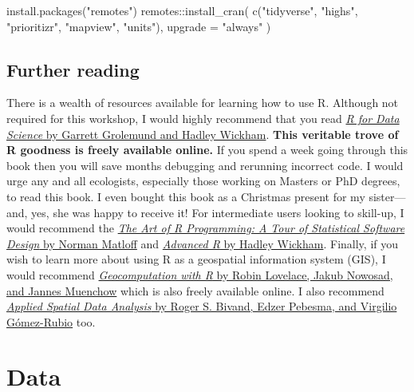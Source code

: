 \documentclass[
  12pt,
]{book}
\newenvironment{Shaded}{\begin{snugshade}}{\end{snugshade}}
\newcommand{\AttributeTok}[1]{\textcolor[rgb]{0.77,0.63,0.00}{#1}}
\newcommand{\FunctionTok}[1]{\textcolor[rgb]{0.00,0.00,0.00}{#1}}
\newcommand{\NormalTok}[1]{#1}
\newcommand{\SpecialCharTok}[1]{\textcolor[rgb]{0.00,0.00,0.00}{#1}}
\newcommand{\StringTok}[1]{\textcolor[rgb]{0.31,0.60,0.02}{#1}}
\begin{document}
\begin{Shaded}
\begin{Highlighting}[]
\FunctionTok{install.packages}\NormalTok{(}\StringTok{"remotes"}\NormalTok{)}
\NormalTok{remotes}\SpecialCharTok{::}\FunctionTok{install\_cran}\NormalTok{(}
  \FunctionTok{c}\NormalTok{(}\StringTok{"tidyverse"}\NormalTok{, }\StringTok{"highs"}\NormalTok{, }\StringTok{"prioritizr"}\NormalTok{, }\StringTok{"mapview"}\NormalTok{, }\StringTok{"units"}\NormalTok{),}
  \AttributeTok{upgrade =} \StringTok{"always"}
\NormalTok{)}
\end{Highlighting}
\end{Shaded}

\hypertarget{further-reading}{%
\section{Further reading}\label{further-reading}}

There is a wealth of resources available for learning how to use R. Although not required for this workshop, I would highly recommend that you read \href{https://r4ds.had.co.nz/}{\emph{R for Data Science} by Garrett Grolemund and Hadley Wickham}. \textbf{This veritable trove of R goodness is freely available online.} If you spend a week going through this book then you will save months debugging and rerunning incorrect code. I would urge any and all ecologists, especially those working on Masters or PhD degrees, to read this book. I even bought this book as a Christmas present for my sister---and, yes, she was happy to receive it! For intermediate users looking to skill-up, I would recommend the \href{http://shop.oreilly.com/product/9781593273842.do}{\emph{The Art of R Programming: A Tour of Statistical Software Design} by Norman Matloff} and \href{https://adv-r.hadley.nz/}{\emph{Advanced R} by Hadley Wickham}. Finally, if you wish to learn more about using R as a geospatial information system (GIS), I would recommend \href{https://geocompr.robinlovelace.net/}{\emph{Geocomputation with R} by Robin Lovelace, Jakub Nowosad, and Jannes Muenchow} which is also freely available online. I also recommend \href{https://www.springer.com/gp/book/9781461476177}{\emph{Applied Spatial Data Analysis} by Roger S. Bivand, Edzer Pebesma, and Virgilio Gómez-Rubio} too.

\hypertarget{data}{%
\chapter{Data}\label{data}}
\end{document}
